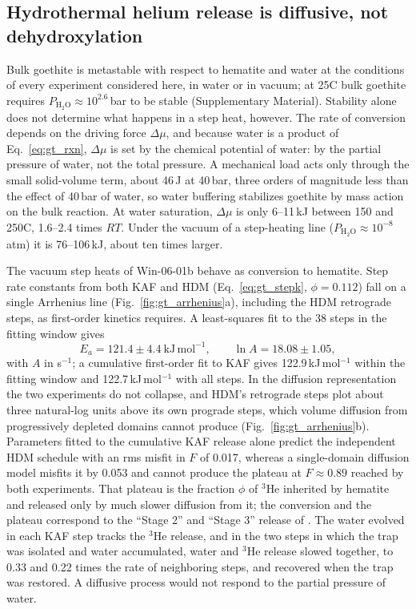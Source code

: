 \subsection{Hydrothermal helium release is diffusive, not dehydroxylation}\label{sec:discussion-conversion}

Bulk goethite is metastable with respect to hematite and water at the conditions of every
experiment considered here, in water or in vacuum; at 25\textdegree C bulk goethite requires
$P_{\mathrm{H_2O}}\approx10^{2.6}$\,bar to be stable (Supplementary Material). Stability alone
does not determine what happens in a step heat, however. The rate of conversion depends on the
driving force $\Delta\mu$, and because water is a product of Eq.~\eqref{eq:gt_rxn}, $\Delta\mu$ is
set by the chemical potential of water: by the partial pressure of water, not the total pressure.
A mechanical load acts only through the small solid-volume term, about 46\,J at 40\,bar, three
orders of magnitude less than the effect of 40\,bar of water, so water buffering stabilizes
goethite by mass action on the bulk reaction. At water saturation, $\Delta\mu$ is only 6--11\,kJ
between 150 and 250\textdegree C, 1.6--2.4 times $RT$. Under the vacuum of a step-heating line
($P_{\mathrm{H_2O}}\approx10^{-8}$\,atm) it is 76--106\,kJ, about ten times larger.

The vacuum step heats of Win-06-01b behave as conversion to hematite. Step rate constants from
both KAF and HDM (Eq.~\eqref{eq:gt_stepk}, $\phi = 0.112$) fall on a single Arrhenius line
(Fig.~\ref{fig:gt_arrhenius}a), including the HDM retrograde steps, as first-order kinetics
requires. A least-squares fit to the 38 steps in the fitting window gives
\begin{equation}
  E_a = 121.4 \pm 4.4~\mathrm{kJ\,mol^{-1}},
  \qquad
  \ln A = 18.08 \pm 1.05 ,
  \label{eq:gt_line}
\end{equation}
with $A$ in s$^{-1}$; a cumulative first-order fit to KAF gives 122.9\,kJ\,mol$^{-1}$ within the fitting window and 122.7\,kJ\,mol$^{-1}$ with all steps. In the diffusion representation the two experiments do not collapse, and
HDM's retrograde steps plot about three natural-log units above its own prograde steps, which
volume diffusion from progressively depleted domains cannot produce
(Fig.~\ref{fig:gt_arrhenius}b). Parameters fitted to the cumulative KAF release alone predict the
independent HDM schedule with an rms misfit in $F$ of 0.017, whereas a single-domain diffusion
model misfits it by 0.053 and cannot produce the plateau at $F\approx0.89$ reached by both
experiments. That plateau is the fraction $\phi$ of $^3$He inherited by hematite and released
only by much slower diffusion from it; the conversion and the plateau correspond to the
``Stage 2'' and ``Stage 3'' release of \citet{farley2024}. The water evolved in each KAF step
tracks the $^3$He release, and in the two steps in which the trap was isolated and water
accumulated, water and $^3$He release slowed together, to 0.33 and 0.22 times the rate of
neighboring steps, and recovered when the trap was restored. A diffusive process would not
respond to the partial pressure of water.


